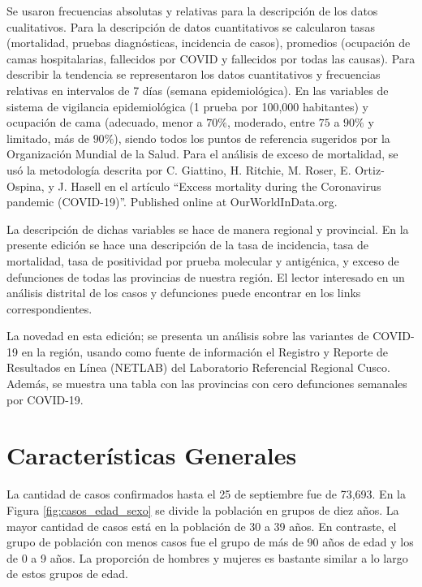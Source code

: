 \documentclass[12pt,a4paper,openany]{book}
\begin{document}
	Se usaron frecuencias absolutas y relativas para la descripción de los datos cualitativos. Para la descripción de datos cuantitativos se calcularon tasas (mortalidad, pruebas diagnósticas, incidencia de casos), promedios (ocupación de camas hospitalarias, fallecidos por COVID y fallecidos por todas las causas). Para describir la tendencia se representaron los datos cuantitativos y frecuencias relativas en intervalos de 7 días (semana epidemiológica). En las variables de sistema de vigilancia epidemiológica (1 prueba por 100,000 habitantes) y ocupación de cama (adecuado, menor a $70\%$, moderado, entre $75$ a $90\%$ y limitado, más de $90\%$), siendo todos los puntos de referencia sugeridos por la Organización Mundial de la Salud. Para el análisis de exceso de mortalidad, se usó la metodología descrita por C. Giattino, H. Ritchie, M. Roser, E. Ortiz-Ospina, y J. Hasell en el artículo ``Excess mortality during the Coronavirus pandemic (COVID-19)''. Published online at OurWorldInData.org.
	
	La descripción de dichas variables se hace de manera regional y provincial. En la presente edición se hace una descripción de la tasa de incidencia, tasa de mortalidad, tasa de positividad por prueba molecular y antigénica, y exceso de defunciones de todas las provincias de nuestra región. El lector interesado en un análisis distrital de los casos y defunciones puede encontrar en los links correspondientes.
	
	La novedad en esta edición; se presenta un análisis sobre las variantes de COVID-19 en la región,  usando como fuente de información el Registro y Reporte de Resultados en Línea (NETLAB) del Laboratorio Referencial Regional Cusco. Además, se muestra una tabla con las provincias con cero defunciones semanales por COVID-19.
	
		
	\chapter*{Características Generales}
	
 	\noindent La cantidad de casos confirmados hasta el 25 de septiembre fue de 73,693. En la Figura \ref{fig:casos_edad_sexo} se divide la población en grupos de diez años. La mayor cantidad de casos está en la población de 30 a 39 años. En contraste, el grupo de población con menos casos fue el grupo de más de 90 años de edad y los de 0 a 9 años. La proporción de hombres y mujeres es bastante similar a lo largo de estos grupos de edad.
	
\end{document}
